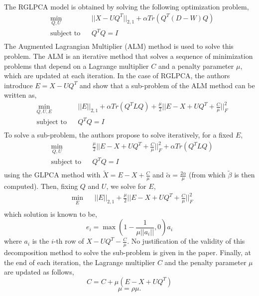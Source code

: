 \documentclass[sigconf]{acmart}
\begin{document}
The RGLPCA model is obtained by solving the following optimization problem,
  \begin{equation*}
    \begin{aligned}
    & \underset{Q, U}{\min}
    & & ||X - UQ^T||_{2, 1} + \alpha Tr(Q^T (D-W) Q) \\
    & \text{subject to}
    & & Q^TQ = I \\
    \end{aligned}
  \end{equation*}
The Augmented Lagrangian Multiplier (ALM) method is used to solve this problem. The ALM is an iterative method that solves a sequence of minimization problems that depend on a Lagrange multiplier $C$ and a penalty parameter $\mu$, which are updated at each iteration.
In the case of RGLPCA, the authors introduce $E = X - UQ^T$ and show that a sub-problem of the ALM method can be written as,
  \begin{equation*}
    \begin{aligned}
    & \underset{Q, U, E}{\min}
    & & ||E||_{2, 1} + \alpha Tr(Q^TLQ) + \frac{\mu}{2}||E - X + UQ^T + \frac{C}{\mu}||_F^2 \\
    & \text{subject to}
    & & Q^TQ = I \\
    \end{aligned}
\end{equation*}
To solve a sub-problem, the authors propose to solve iteratively, for a fixed $E$,
\begin{equation*}
    \begin{aligned}
    & \underset{Q, U}{\min}
    & & \frac{\mu}{2}||E - X + UQ^T + \frac{C}{\mu}||_F^2 + \alpha Tr(Q^TLQ) \\
    & \text{subject to}
    & & Q^TQ = I \\
    \end{aligned}
\end{equation*}
using the GLPCA method with $\tilde{X} = E - X + \frac{C}{\mu}$ and $\tilde{\alpha} = \frac{2\alpha}{\mu}$ (from which $\tilde{\beta}$ is then computed). Then, fixing $Q$ and $U$, we solve for $E$,
\begin{equation*}
    \begin{aligned}
    & \underset{E}{\min}
    & & ||E||_{2, 1} + \frac{\mu}{2}||E - X + UQ^T + \frac{C}{\mu}||_F^2 \\
    \end{aligned}
\end{equation*}
which solution is known to be,
$$ e_i = \max(1 - \frac{1}{\mu||a_i||}, 0)a_i$$
where $a_i$ is the $i$-th row of $X - UQ^T - \frac{C}{\mu}$.
No justification of the validity of this decomposition method to solve the sub-problem is given in the paper.
Finally, at the end of each iteration, the Lagrange multiplier $C$ and the penalty parameter $\mu$ are updated as follows,
$$ C = C + \mu(E - X + UQ^T)$$
$$ \mu = \rho \mu.$$
  
\end{document}
